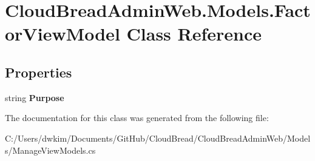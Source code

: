 \hypertarget{class_cloud_bread_admin_web_1_1_models_1_1_factor_view_model}{}\section{Cloud\+Bread\+Admin\+Web.\+Models.\+Factor\+View\+Model Class Reference}
\label{class_cloud_bread_admin_web_1_1_models_1_1_factor_view_model}
\subsection*{Properties}
\begin{DoxyCompactItemize}
\item 
string {\bfseries Purpose}\hypertarget{class_cloud_bread_admin_web_1_1_models_1_1_factor_view_model_aeae54cc6159853dbd9931d76366b9124}{}\label{class_cloud_bread_admin_web_1_1_models_1_1_factor_view_model_aeae54cc6159853dbd9931d76366b9124}

\end{DoxyCompactItemize}


The documentation for this class was generated from the following file\+:\begin{DoxyCompactItemize}
\item 
C\+:/\+Users/dwkim/\+Documents/\+Git\+Hub/\+Cloud\+Bread/\+Cloud\+Bread\+Admin\+Web/\+Models/Manage\+View\+Models.\+cs\end{DoxyCompactItemize}
